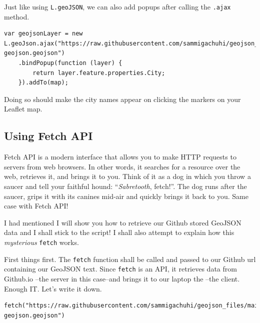 \documentclass[
]{book}
\begin{document}
Just like using \texttt{L.geoJSON}, we can also add popups after calling the \texttt{.ajax} method.

\begin{verbatim}
var geojsonLayer = new L.geoJson.ajax("https://raw.githubusercontent.com/sammigachuhi/geojson_files/main/cities-geojson.geojson")
    .bindPopup(function (layer) {
        return layer.feature.properties.City;
    }).addTo(map);
\end{verbatim}

Doing so should make the city names appear on clicking the markers on your Leaflet map.

\hypertarget{using-fetch-api}{%
\subsection{Using Fetch API}\label{using-fetch-api}}

Fetch API is a modern interface that allows you to make HTTP requests to servers from web browsers. In other words, it searches for a resource over the web, retrieves it, and brings it to you. Think of it as a dog in which you throw a saucer and tell your faithful hound: ``\emph{Sabretooth}, fetch!''. The dog runs after the saucer, grips it with its canines mid-air and quickly brings it back to you. Same case with Fetch API!

I had mentioned I will show you how to retrieve our Github stored GeoJSON data and I shall stick to the script! I shall also attempt to explain how this \emph{mysterious} \texttt{fetch} works.

First things first. The \texttt{fetch} function shall be called and passed to our Github url containing our GeoJSON text. Since \texttt{fetch} is an API, it retrieves data from Github.io --the server in this case--and brings it to our laptop the --the client. Enough IT. Let's write it down.

\begin{verbatim}
fetch("https://raw.githubusercontent.com/sammigachuhi/geojson_files/main/cities-geojson.geojson")
\end{verbatim}
\end{document}
